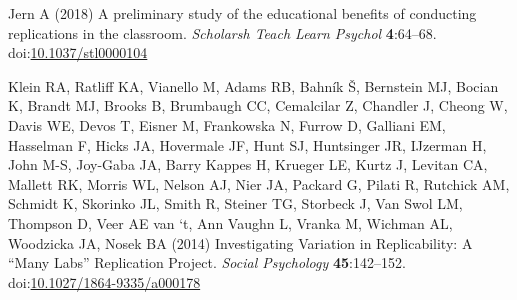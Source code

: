 \documentclass[
  english,
  a4paper,
]{article}
\newlength{\cslhangindent}
\newlength{\cslentryspacingunit} %
\newenvironment{CSLReferences}[2] %
 {%
  \setlength{\parindent}{0pt}
  \ifodd #1
  \let\oldpar\par
  \def\par{\hangindent=\cslhangindent\oldpar}
  \fi
  \setlength{\parskip}{#2\cslentryspacingunit}
 }%
 {}
\begin{document}
\begin{CSLReferences}{1}{0}
\leavevmode{}%
Jern A (2018) A preliminary study of the educational benefits of conducting replications in the classroom. \emph{Scholarsh Teach Learn Psychol} \textbf{4}:64--68. doi:\href{https://doi.org/10.1037/stl0000104}{10.1037/stl0000104}

\leavevmode{}%
Klein RA, Ratliff KA, Vianello M, Adams RB, Bahník Š, Bernstein MJ, Bocian K, Brandt MJ, Brooks B, Brumbaugh CC, Cemalcilar Z, Chandler J, Cheong W, Davis WE, Devos T, Eisner M, Frankowska N, Furrow D, Galliani EM, Hasselman F, Hicks JA, Hovermale JF, Hunt SJ, Huntsinger JR, IJzerman H, John M-S, Joy-Gaba JA, Barry Kappes H, Krueger LE, Kurtz J, Levitan CA, Mallett RK, Morris WL, Nelson AJ, Nier JA, Packard G, Pilati R, Rutchick AM, Schmidt K, Skorinko JL, Smith R, Steiner TG, Storbeck J, Van Swol LM, Thompson D, Veer AE van `t, Ann Vaughn L, Vranka M, Wichman AL, Woodzicka JA, Nosek BA (2014) Investigating {Variation} in {Replicability}: {A} {``{Many Labs}''} {Replication Project}. \emph{Social Psychology} \textbf{45}:142--152. doi:\href{https://doi.org/10.1027/1864-9335/a000178}{10.1027/1864-9335/a000178}


\end{CSLReferences}
\end{document}
